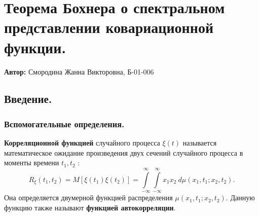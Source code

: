
	\section{Теорема Бохнера о спектральном представлении ковариационной функции.}
	
	\textbf{Автор:} Смородина Жанна Викторовна, Б-01-006
	
 	\subsection{Введение.}

    \subsubsection{Вспомогательные определения.}
    
    \begin{definition}\label{smd_def_1} \textbf{Корреляционной функцией} случайного процесса $\xi(t)$ называется математическое ожидание произведения двух сечений случайного процесса в моменты времени $t_1, t_2$ :
    $$
     R_{\xi}\left(t_1, t_2\right)=M\left[\xi\left(t_1\right) \xi\left(t_2\right)\right]=  \int\limits_{-\infty}^{\infty} \int\limits_{-\infty}^{\infty} x_1 x_2 \  d \mu\left(x_1, t_1 ; x_2, t_2\right) .
    $$
    Она определяется двумерной функцией распределения $\mu\left(x_1, t_1 ; x_2, t_2\right)$. \newline Данную функцию также называют \textbf{функцией автокорреляции}.
    \end{definition}
    

